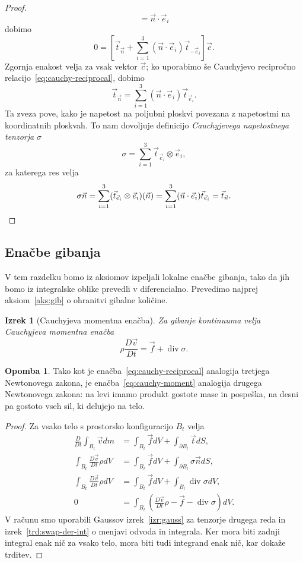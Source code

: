 \documentclass[12pt,a4paper,twoside]{article}
\theoremstyle{definition} %
\newtheorem{opomba}[definicija]{Opomba}
\theoremstyle{plain} %
\newtheorem{izrek}[definicija]{Izrek}
\numberwithin{equation}{section}
\renewcommand{\div}{\operatorname{div}}
\newcommand{\DD}[2]{\ensuremath{\frac{D #1}{D #2}}}
\newcommand{\DDt}[1]{\DD{#1}{t}}
\newcommand{\vv}{\vec{v}}
\newcommand{\vt}{\vec{t}}
\newcommand{\vc}{\vec{c}}
\newcommand{\vn}{\vec{n}}
\newcommand{\vf}{\vec{f}}
\newcommand{\ts}{\sigma}
\begin{document}
\begin{proof}
\[  = \vn\cdot\vec{e}_i
\]
dobimo
\[
  0 = \left[\vt_{\vn} + \sum_{i=1}^3 (\vn \cdot\vec{e}_i) \vt_{-\vec{e}_i}\right]\vc.
\]
Zgornja enakost velja za vsak vektor $\vc$; ko uporabimo še Cauchyjevo recipročno
relacijo~\eqref{eq:cauchy-reciprocal}, dobimo
\[
  \vt_{\vn} = \sum_{i=1}^3 (\vn \cdot\vec{e}_i) \vt_{\vec{e}_i}.
\]
Ta zveza pove, kako je napetost na poljubni ploskvi povezana z napetostmi na koordinatnih
ploskvah. To nam dovoljuje definicijo \emph{Cauchyjevega napetostnega tenzorja}
$\ts$
\[
  \ts = \sum_{i=1}^3 \vt_{\vec{e}_i}\otimes \vec{e}_i,
\]
za katerega res velja
\[
  \ts\vn = \sum_{i=1}^3 (\vt_{\vec{e}_i}\otimes \vec{e}_i)(\vn) =
  \sum_{i=1}^3 (\vn \cdot\vec{e}_i) \vt_{\vec{e}_i} = \vt_{\vn}. \qedhere
\]
\end{proof}

\subsection{Enačbe gibanja}
V tem razdelku bomo iz aksiomov izpeljali lokalne enačbe gibanja, tako da jih
bomo iz integralske oblike prevedli v diferencialno.
Prevedimo najprej aksiom~\ref{aks:gib} o ohranitvi gibalne količine.
\begin{izrek}[Cauchyjeva momentna enačba]
  Za gibanje kontinuuma velja Cauchyjeva momentna enačba
  \begin{equation}
    \rho \DDt{\vv} = \vf + \div \sigma.
    \label{eq:cauchy-moment}
  \end{equation}
\end{izrek}
\begin{opomba}
  Tako kot je enačba~\eqref{eq:cauchy-reciprocal} analogija tretjega Newtonovega zakona, je
  enačba~\eqref{eq:cauchy-moment} analogija drugega Newtonovega zakona: na levi imamo produkt
  gostote mase in pospeška, na desni pa gostoto vseh sil, ki delujejo na telo.
\end{opomba}
\begin{proof}
Za vsako telo s prostorsko konfiguracijo $B_t$ velja
\begin{align*}
  \DDt{} \int_{B_t} \vv dm &= \int_{B_t} \vf dV + \int_{\partial {B_t}} \vt dS, \\
  \int_{B_t} \DDt{\vv}\rho dV &= \int_{B_t} \vf dV + \int_{\partial {B_t}} \ts \vn dS, \\
  \int_{B_t} \DDt{\vv}\rho dV &= \int_{B_t} \vf dV + \int_{B_t} \div \ts dV, \\
  0 &= \int_{B_t}\left(\DDt{\vv}\rho - \vf - \div \ts\right) dV.
\end{align*}
V računu smo uporabili Gaussov izrek~\ref{izr:gauss} za tenzorje drugega reda in
izrek~\ref{trd:swap-der-int} o menjavi odvoda in integrala. Ker mora biti zadnji
integral enak nič za vsako telo, mora biti tudi integrand enak nič, kar dokaže trditev.
\end{proof}
\end{document}
